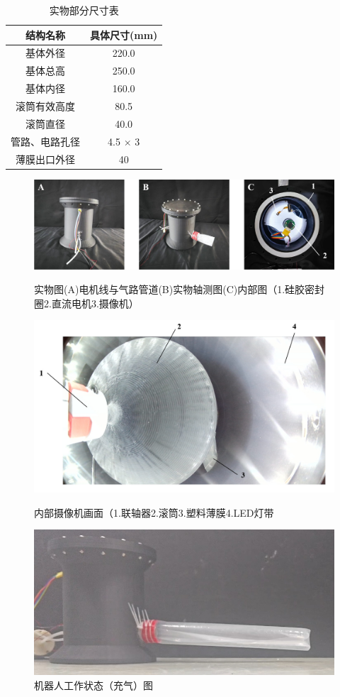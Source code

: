 \documentclass[11pt, a4paper, oneside]{ctexart}
\begin{document}
\begin{table}[H]
    \centering
    \caption{实物部分尺寸表}
    \label{实物部分尺寸表}
    \begin{tabular}{cc}
        \toprule
        结构名称 & 具体尺寸(mm) \\
        \midrule
        基体外径 & 220.0 \\
        基体总高 & 250.0 \\
        基体内径 & 160.0 \\
        滚筒有效高度 & 80.5 \\
        滚筒直径 & 40.0 \\
        管路、电路孔径 & 4.5 $\times$ 3 \\
        薄膜出口外径 & 40 \\
        \bottomrule
    \end{tabular}    
\end{table}

\begin{figure}[H]
    \centering
    \includegraphics[scale=0.25]{外部图}
    \caption{实物图(A)电机线与气路管道(B)实物轴测图(C)内部图（1.硅胶密封圈2.直流电机3.摄像机）}
    \label{外部图}
    \includegraphics[scale=0.3]{内部图}
    \caption{内部摄像机画面（1.联轴器2.滚筒3.塑料薄膜4.LED灯带}
    \label{内部图}
    \includegraphics[scale=0.5]{生长图}
    \caption{机器人工作状态（充气）图}
    \label{生长图}
\end{figure}
\end{document}
